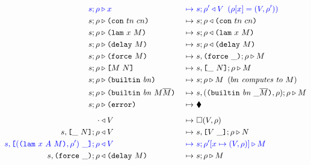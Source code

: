 \documentclass[../zerepoch-core-specification.tex]{subfiles}
\begin{document}
\begin{figure}[H]
\ContinuedFloat
  \begin{subfigure}[c]{\linewidth}

    \begin{minipage}{\linewidth}
\begin{alignat*}{2}
  \blue{s; \rho} & \bcompute \blue{x} &~\bmapsto~ &\blue{s;\rho^{\prime} \return V \enspace (\rho[x] = (V,\rho^{\prime}))}\\
  s;\rho & \compute \con{tn}{cn}                      &~\mapsto~& s;\rho \return \con{tn}{cn}\\
  s;\rho & \compute \lamU{x}{M}                       &~\mapsto~& s;\rho \return \lamU{x}{M}\\
  s;\rho & \compute \delay{M}                         &~\mapsto~& s;\rho \return \delay{M}\\
  s;\rho & \compute \force{M}                         &~\mapsto~& s,\inForceFrame{};\rho \compute M \\
  s;\rho & \compute \appU{M}{N}                       &~\mapsto~& s,\inAppLeftFrame{N};\rho \compute M\\
  s;\rho & \compute \builtinU{bn}{\!\!}               &~\mapsto~& s;\rho \compute M
                                                 \enspace (\textit{$bn$ computes to $M$}) \\
  s;\rho & \compute \builtinU{bn}{M \repetition{M}}   &~\mapsto~& s,(\inBuiltinU{bn}{}{\_}{\repetition{M}}, \rho);\rho \compute M\\
  s;\rho & \compute \errorU                           &~\mapsto~& \ckerror{}\\
  \\[-10pt] %
  \cdot & \return V                              &~\mapsto~& \square (V,\rho)\\
  s,\inAppLeftFrame{N};\rho& \return V               &~\mapsto~& s,\inAppRightFrame{V};\rho \compute N\\
  \blue{s,\inAppRightFrame{(\lam{x}{A}{M}, \rho^{\prime})}; \rho} &\breturn V &~\bmapsto~& \blue{s;\rho^{\prime}[x\mapsto (V,\rho)] \compute M}\\  %
  s,\inForceFrame{};\rho & \return \delay{M}          &~\mapsto~& s;\rho \compute M\\

\end{alignat*}
\end{minipage}
\end{subfigure}
\end{figure}
\end{document}
